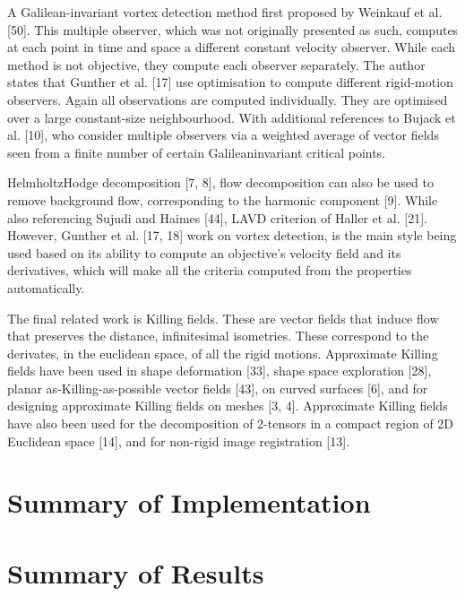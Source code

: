 \documentclass[a4paper,9pt]{article}
\begin{document}
A Galilean-invariant vortex detection method first proposed by Weinkauf et al. [50]. This multiple observer, which was not originally presented as such, computes at each point in time and space a different constant velocity observer. While each method is not objective, they compute each observer separately. The author states that Gunther et al. [17] use optimisation to compute different rigid-motion observers. Again all observations are computed individually. They are optimised over a large constant-size neighbourhood. With additional references to Bujack et al. [10], who consider multiple observers via a weighted average of vector fields seen from a finite number of certain Galileaninvariant critical points.

HelmholtzHodge decomposition [7, 8], flow decomposition can also be used to remove background flow, corresponding to the harmonic component [9]. While also referencing Sujudi and Haimes [44], LAVD criterion of Haller et al. [21]. However, Gunther et al. [17, 18] work on vortex detection, is the main style being used based on its ability to compute an objective's velocity field and its derivatives, which will make all the criteria computed from the properties automatically.

The final related work is Killing fields. These are vector fields that induce flow that preserves the distance, infinitesimal isometries. These correspond to the derivates, in the euclidean space, of all the rigid motions. Approximate Killing fields have been used in shape deformation [33], shape space exploration [28], planar as-Killing-as-possible vector fields [43], on curved surfaces [6], and for designing approximate Killing fields on meshes [3, 4]. Approximate Killing fields have also been used for the decomposition of 2-tensors in a compact region of 2D Euclidean space [14], and for non-rigid image registration [13].

\section{Summary of Implementation}


\section{Summary of Results}
\end{document}
